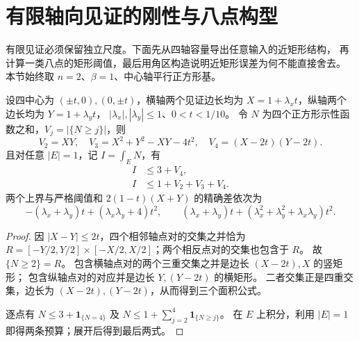 \section{有限轴向见证的刚性与八点构型}\label{wr:section}

有限见证必须保留独立尺度。下面先从四轴容量导出任意输入的近矩形结构，
再计算一类八点的矩形阈值，最后用角区构造说明近矩形误差为何不能直接舍去。
本节始终取 $n=2$、$\beta=1$、中心轴平行正方形基。

\begin{lemma}[四轴的精确层容量]\label{wr:layers}
设四中心为 $(\pm t,0),(0,\pm t)$，横轴两个见证边长均为
$X=1+\lambda_x t$，纵轴两个边长均为 $Y=1+\lambda_y t$，
$|\lambda_x|,|\lambda_y|\le1$、$0<t<1/10$。
令 $N$ 为四个正方形示性函数之和，$V_j=|\{N\ge j\}|$，则
\[
 V_2=XY,\quad V_3=X^2+Y^2-XY-4t^2,\quad V_4=(X-2t)(Y-2t).
\]
且对任意 $|E|=1$，记 $I=\int_E N$，有
\begin{align*}
 I&\le3+V_4,\\
 I&\le1+V_2+V_3+V_4.
\end{align*}
两个上界与严格阈值和 $2(1-t)(X+Y)$ 的精确差依次为
\[
 -(\lambda_x+\lambda_y)t+(\lambda_x\lambda_y+4)t^2,
 \qquad
 (\lambda_x+\lambda_y)t+
 (\lambda_x^2+\lambda_y^2+\lambda_x\lambda_y)t^2.
\]
\end{lemma}
\begin{proof}
因 $|X-Y|\le2t$，四个相邻轴点对的交集之并恰为
$R=[-Y/2,Y/2]\times[-X/2,X/2]$；两个相反点对的交集也包含于 $R$。
故 $\{N\ge2\}=R$。
包含横轴点对的两个三重交集之并是边长 $(X-2t),X$ 的竖矩形；
包含纵轴点对的对应并是边长 $Y,(Y-2t)$ 的横矩形。
二者交集正是四重交集，边长为 $(X-2t),(Y-2t)$，从而得到三个面积公式。

逐点有 $N\le3+\mathbf1_{\{N=4\}}$ 及
$N\le1+\sum_{j=2}^4\mathbf1_{\{N\ge j\}}$。
在 $E$ 上积分，利用 $|E|=1$ 即得两条预算；展开后得到最后两式。
\end{proof}

